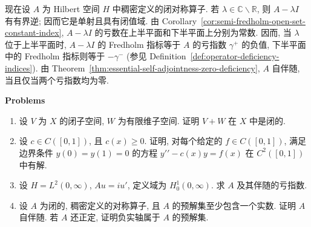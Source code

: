 现在设 $A$ 为 Hilbert 空间 $H$ 中稠密定义的闭对称算子. 若 $\lambda\in\mathbb{C}\backslash\mathbb{R}$, 则 $A-\lambda I$ 有有界逆; 因而它是单射且具有闭值域. 由 Corollary~\ref{cor:semi-fredholm-open-set-constant-index}, $A-\lambda I$ 的亏数在上半平面和下半平面上分别为常数. 因而, 当 $\lambda$ 位于上半平面时, $A-\lambda I$ 的 Fredholm 指标等于 $A$ 的亏指数 $\gamma^+$ 的负值, 下半平面中的 Fredholm 指标则等于 $-\gamma^-$ (参见 Definition~\ref{def:operator-deficiency-indices}). 由 Theorem~\ref{thm:essential-self-adjointness-zero-deficiency}, $A$ 自伴随, 当且仅当两个亏指数均为零.

\textbf{Problems}

\begin{enumerate}[label=\thesection.\arabic*.,ref=\thesection.\arabic*,start=54,series=book-problems]

\item\label{ex:closed-plus-finite-dimensional-subspace} 设 $V$ 为 $X$ 的闭子空间, $W$ 为有限维子空间. 证明 $V+W$ 在 $X$ 中是闭的.

\item\label{ex:positive-potential-dirichlet-classical-solvability} 设 $c\in C([0,1])$, 且 $c(x)\geq0$. 证明, 对每个给定的 $f\in C([0,1])$, 满足边界条件 $y(0)=y(1)=0$ 的方程 $y\prime\prime-c(x)y=f(x)$ 在 $C^2([0,1])$ 中有解.

\item\label{ex:half-line-differentiation-deficiency-indices} 设 $H=L^2(0,\infty)$, $Au=iu\prime$, 定义域为 $H_0^1(0,\infty)$. 求 $A$ 及其伴随的亏指数.

\item\label{ex:real-resolvent-implies-self-adjointness} 设 $A$ 为闭的, 稠密定义的对称算子, 且 $A$ 的预解集至少包含一个实数. 证明 $A$ 自伴随. 若 $A$ 还正定, 证明负实轴属于 $A$ 的预解集.

\end{enumerate}
